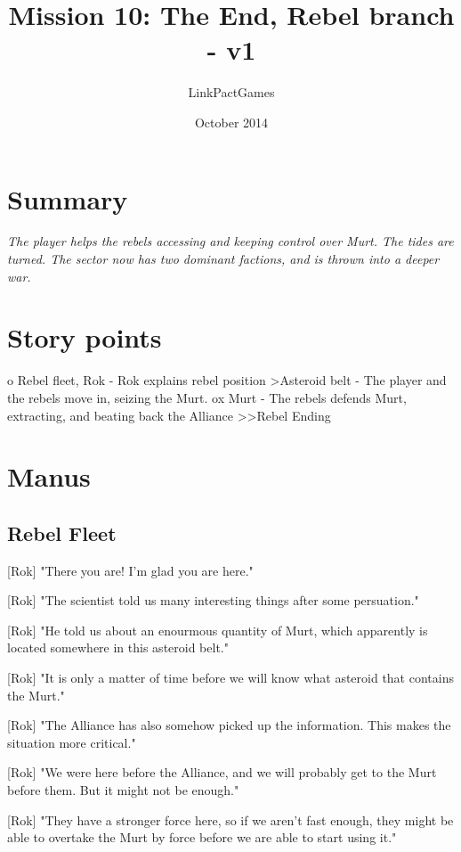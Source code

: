 \documentclass[a4paper,12pt]{article}
\begin{document}
\title{Mission 10: The End, Rebel branch - v1}
\author{LinkPactGames}
\date{October 2014}
\maketitle

\section{Summary}

\textit{The player helps the rebels accessing and keeping control over Murt. The tides are turned.
The sector now has two dominant factions, and is thrown into a deeper war.}

\section{Story points}

o Rebel fleet, Rok - Rok explains rebel position
\textgreater Asteroid belt - The player and the rebels move in, seizing the Murt.
ox Murt - The rebels defends Murt, extracting, and beating back the Alliance
\textgreater \textgreater Rebel Ending

\section{Manus}

\subsection{Rebel Fleet}

[Rok] "There you are! I'm glad you are here."

[Rok] "The scientist told us many interesting things after some persuation."

[Rok] "He told us about an enourmous quantity of Murt, which apparently is located somewhere in this asteroid belt."

[Rok] "It is only a matter of time before we will know what asteroid that contains the Murt."

[Rok] "The Alliance has also somehow picked up the information. This makes the situation more critical."

[Rok] "We were here before the Alliance, and we will probably get to the Murt before them. But it might not be enough."

[Rok] "They have a stronger force here, so if we aren't fast enough, they might be able to overtake the Murt by force
before we are able to start using it."
\end{document}
